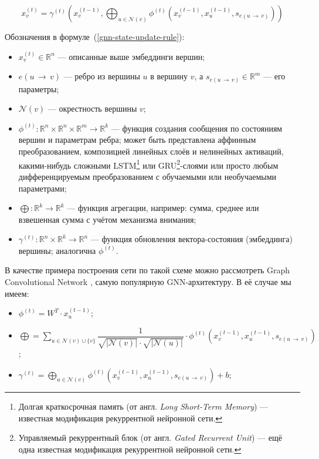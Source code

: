\begin{equation} \label{gnn-state-update-rule}
    x_v^{(t)} = \gamma^{(t)} \left(x_v^{(t - 1)}, \bigoplus_{u \in \mathcal{N}(v)} \phi^{(t)} \left(x_v^{(t - 1)}, x_u^{(t - 1)}, s_{e(u \, \to \, v)} \right) \right)
\end{equation}

Обозначения в формуле~(\ref{gnn-state-update-rule}):

\begin{itemize}
    \item $x_v^{(t)} \in \mathbb{R}^n$ --- описанные выше эмбеддинги вершин;
    \item $e(u \, \to \, v)$ --- ребро из вершины $u$ в вершину $v$, а $s_{e(u \, \to \, v)} \in \mathbb{R}^m$ --- его параметры;
    \item $\mathcal{N}(v)$ --- окрестность вершины $v$;
    \item $\phi^{(t)}: \mathbb{R}^n \times \mathbb{R}^n \times \mathbb{R}^m \to \mathbb{R}^k$ --- функция создания сообщения по состояниям вершин и параметрам ребра; может быть представлена аффинным преобразованием, композицией линейных слоёв и нелинейных активаций, какими-нибудь сложными LSTM\footnote{Долгая краткосрочная память (от англ. \textit{Long Short-Term Memory}) --- известная модификация рекуррентной нейронной сети.} или GRU\footnote{Управляемый рекуррентный блок (от англ. \textit{Gated Recurrent Unit}) --- ещё одна известная модификация рекуррентной нейронной сети.}-слоями или просто любым дифференцируемым преобразованием с обучаемыми или необучаемыми параметрами;
    \item $\bigoplus: \mathbb{R}^k \to \mathbb{R}^k$ --- функция агрегации, например: сумма, среднее или взвешенная сумма с учётом механизма внимания;
    \item $\gamma^{(t)}: \mathbb{R}^n \times \mathbb{R}^k \to \mathbb{R}^n$ --- функция обновления вектора-состояния (эмбеддинга) вершины; аналогична $\phi^{(t)}$.
\end{itemize}

В качестве примера построения сети по такой схеме можно рассмотреть Graph Convolutional Network \cite{gcn-conv-paper}, самую популярную GNN-архитектуру. В её случае мы имеем:

\begin{itemize}
    \item $\phi^{(t)} = W^T \cdot x_u^{(t - 1)}$;
    \item $\bigoplus = \sum \limits_{u \in \mathcal{N}(v) \cup \{v\}} \dfrac{1}{\sqrt{|\mathcal{N}(v)|} \cdot \sqrt{|\mathcal{N}(u)|}} \cdot \phi^{(t)} \left(x_v^{(t - 1)}, x_u^{(t - 1)}, s_{e(u \, \to \, v)} \right)$;
    \item $\gamma^{(t)} = \bigoplus \limits_{u \in \mathcal{N}(v)} \phi^{(t)} \left(x_v^{(t - 1)}, x_u^{(t - 1)}, s_{e(u \, \to \, v)} \right) + b$;
\end{itemize}

